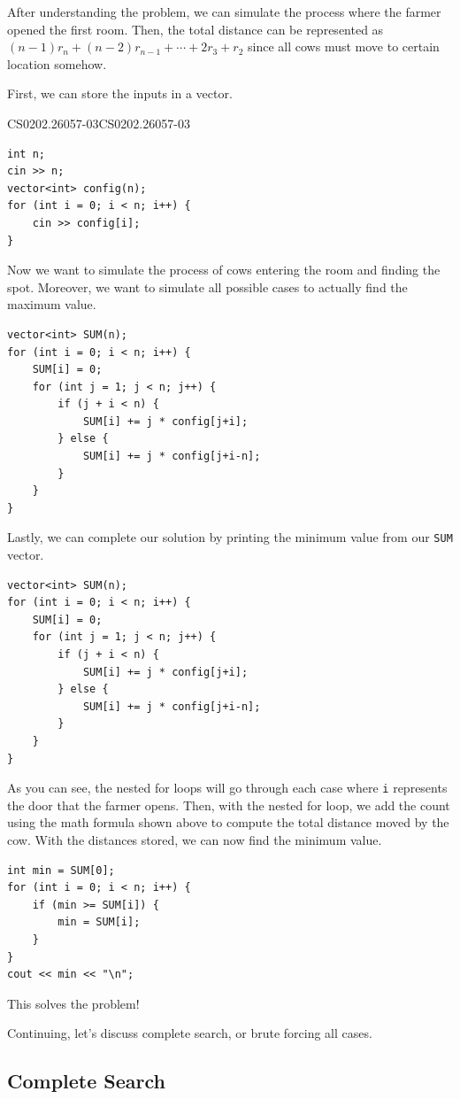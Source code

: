 \documentclass[../../main.tex]{subfiles}
\begin{document}
\begin{solution}
After understanding the problem, we can simulate the process where
the farmer opened the first room. Then, the total distance can
be represented as $(n-1) r_n + (n-2) r_{n-1} + \cdots + 2 r_3 + r_2$
since all cows must move to certain location somehow.

First, we can store the inputs in a vector.

\begin{cppboxSolution}{CS0202.26057-03}{CS0202.26057-03}
\begin{lstlisting}[style=cppstyle]
int n;
cin >> n;
vector<int> config(n);
for (int i = 0; i < n; i++) {
    cin >> config[i];
}
\end{lstlisting}
\end{cppboxSolution}

Now we want to simulate the process of cows entering the room
and finding the spot. Moreover, we want to simulate all possible
cases to actually find the maximum value.

\begin{basicboxSolution}
\begin{lstlisting}[style=cppstyle]
vector<int> SUM(n);
for (int i = 0; i < n; i++) {
    SUM[i] = 0;
    for (int j = 1; j < n; j++) {
        if (j + i < n) {
            SUM[i] += j * config[j+i];
        } else {
            SUM[i] += j * config[j+i-n];
        }
    }
}
\end{lstlisting}
\end{basicboxSolution}

Lastly, we can complete our solution by printing the minimum
value from our \verb|SUM| vector.

\begin{basicboxSolution}
\begin{lstlisting}[style=cppstyle]
vector<int> SUM(n);
for (int i = 0; i < n; i++) {
    SUM[i] = 0;
    for (int j = 1; j < n; j++) {
        if (j + i < n) {
            SUM[i] += j * config[j+i];
        } else {
            SUM[i] += j * config[j+i-n];
        }
    }
}
\end{lstlisting}
\end{basicboxSolution}

As you can see, the nested for loops will go through each case
where \verb|i| represents the door that the farmer opens.
Then, with the nested for loop, we add the count using the
math formula shown above to compute the total distance moved
by the cow. With the distances stored, we can now find the
minimum value.

\begin{basicboxSolution}
\begin{lstlisting}[style=cppstyle]
int min = SUM[0];
for (int i = 0; i < n; i++) {
    if (min >= SUM[i]) {
        min = SUM[i];
    }
}
cout << min << "\n";
\end{lstlisting}
\end{basicboxSolution}

This solves the problem!
\end{solution}

Continuing, let's discuss complete search, or brute forcing all cases.

\subsection{Complete Search}
\end{document}

